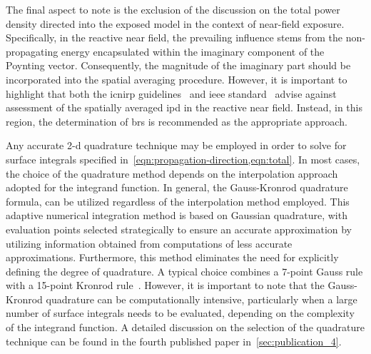 The final aspect to note is the exclusion of the discussion on the total power density directed into the exposed model in the context of near-field exposure.
Specifically, in the reactive near field, the prevailing influence stems from the non-propagating energy encapsulated within the imaginary component of the Poynting vector.
Consequently, the magnitude of the imaginary part should be incorporated into the spatial averaging procedure.
However, it is important to highlight that both the \gls{icnirp} guidelines~\cite{ICNIRP2020Guidelines} and \gls{ieee} standard~\cite{IEEE2019Standard} advise against assessment of the spatially averaged \gls{ipd} in the reactive near field.
Instead, in this region, the determination of \gls{br}s is recommended as the appropriate approach.

Any accurate \gls{2-d} quadrature technique may be employed in order to solve for surface integrals specified in~\cref{eqn:propagation-direction,eqn:total}.
In most cases, the choice of the quadrature method depends on the interpolation approach adopted for the integrand function.
In general, the Gauss-Kronrod quadrature formula, can be utilized regardless of the interpolation method employed.
This adaptive numerical integration method is based on Gaussian quadrature, with evaluation points selected strategically to ensure an accurate approximation by utilizing information obtained from computations of less accurate approximations.
Furthermore, this method eliminates the need for explicitly defining the degree of quadrature.
A typical choice combines a \num{7}-point Gauss rule with a \num{15}-point Kronrod rule~\cite{Kahaner1989Numerical}.
However, it is important to note that the Gauss-Kronrod quadrature can be computationally intensive, particularly when a large number of surface integrals needs to be evaluated, depending on the complexity of the integrand function.
A detailed discussion on the selection of the quadrature technique can be found in the fourth published paper in~\cref{sec:publication_4}.

